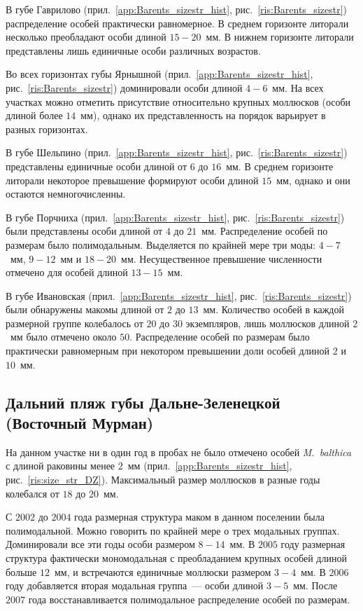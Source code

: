 В губе Гаврилово (прил.~\ref{app:Barents_sizestr_hist}, рис.~\ref{ris:Barents_sizestr}) распределение особей практически равномерное. 
В среднем горизонте литорали несколько преобладают особи длиной $15-20$~мм. 
В нижнем горизонте литорали представлены лишь единичные особи различных возрастов.	

Во всех горизонтах губы Ярнышной (прил.~\ref{app:Barents_sizestr_hist}, рис.~\ref{ris:Barents_sizestr}) доминировали особи длиной $4-6$~мм. 
На всех участках можно отметить присутствие относительно крупных моллюсков (особи длиной более $14$~мм), однако их представленность на порядок варьирует в разных горизонтах.

В губе Шельпино (прил.~\ref{app:Barents_sizestr_hist}, рис.~\ref{ris:Barents_sizestr})  представлены единичные особи длиной от $6$ до $16$~мм. 
В среднем горизонте литорали некоторое превышение формируют особи длиной $15$~мм, однако и они остаются немногочисленны.

В губе Порчниха (прил.~\ref{app:Barents_sizestr_hist}, рис.~\ref{ris:Barents_sizestr}) были представлены особи длиной от $4$ до $21$~мм. 
Распределение особей по размерам было полимодальным. 
Выделяется по крайней мере три моды: $4-7$~мм, $9-12$~мм и $18-20$~мм. 
Несущественное превышение численности  отмечено для особей длиной $13-15$~мм.

В губе Ивановская (прил.~\ref{app:Barents_sizestr_hist}, рис.~\ref{ris:Barents_sizestr}) были обнаружены макомы длиной от $2$ до $13$~мм. 
Количество особей в каждой размерной группе колебалось от $20$ до $30$ экземпляров, лишь моллюсков длиной $2$~мм было отмечено около $50$. 
Распределение особей по размерам было практически равномерным при некотором превышении доли особей длиной $2$ и $10$~мм. 

		\subsection{Дальний пляж губы Дальне-Зеленецкой (Восточный Мурман)}
На данном участке ни в один год в пробах не было отмечено особей {\it M.~balthica} с длиной раковины менее $2$~мм (прил.~\ref{app:Barents_sizestr_hist}, рис.~\ref{ris:size_str_DZ}). 
Максимальный размер моллюсков в разные годы колебался от $18$ до $20$~мм. 

С $2002$ до $2004$ года размерная структура маком в данном поселении была полимодальной. 
Можно говорить по крайней мере о трех модальных группах.
Доминировали все эти годы особи размером $8 - 14$~мм.
В $2005$ году размерная структура фактически мономодальная с преобладанием крупных особей длиной больше $12$~мм, и встречаются единичные моллюски размером $3 - 4$~мм.
В $2006$ году добавляется вторая модальная группа~--- особи длиной $3 - 5$~мм.
После $2007$ года восстанавливается полимодальное распределение особей по размерам.


